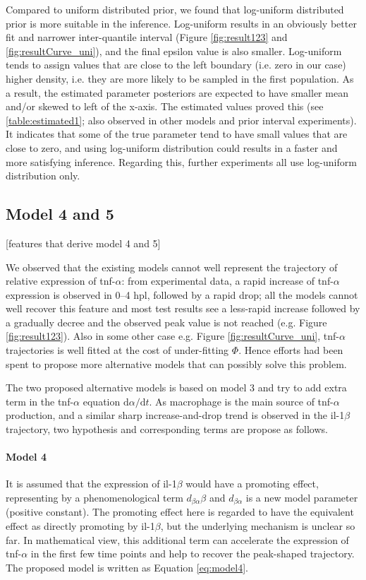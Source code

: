 \documentclass[12pt,a4paper]{report}
\begin{document}
Compared to uniform distributed prior, we found that log-uniform distributed prior is more suitable in the inference. Log-uniform results in an obviously better fit and narrower inter-quantile interval (Figure \ref{fig:result123} and \ref{fig:resultCurve_uni}), and the final epsilon value is also smaller. Log-uniform tends to assign values that are close to the left boundary (i.e. zero in our case) higher density, i.e. they are more likely to be sampled in the first population. As a result, the estimated parameter posteriors are expected to have smaller mean and/or skewed to left of the x-axis. The estimated values proved this (see \ref{table:estimated1}; also observed in other models and prior interval experiments). It indicates that some of the true parameter tend to have small values that are close to zero, and using log-uniform distribution could results in a faster and more satisfying inference. Regarding this, further experiments all use log-uniform distribution only.


\subsection{Model 4 and 5}

[features that derive model 4 and 5]

We observed that the existing models cannot well represent the trajectory of relative expression of tnf-$\alpha$: from experimental data, a rapid increase of tnf-$\alpha$ expression is observed in 0--4 hpl, followed by a rapid drop; all the models cannot well recover this feature and most test results see a less-rapid increase followed by a gradually decree and the observed peak value is not reached (e.g. Figure \ref{fig:result123}). Also in some other case e.g. Figure \ref{fig:resultCurve_uni}, tnf-$\alpha$ trajectories is well fitted at the cost of under-fitting $\Phi$. Hence efforts had been spent to propose more alternative models that can possibly solve this problem.

The two proposed alternative models is based on model 3 and try to add extra term in the tnf-$\alpha$ equation $\mathrm{d} \alpha/\mathrm{d} t$. As macrophage is the main source of tnf-$\alpha$ production, and a similar sharp increase-and-drop trend is observed in the il-1$\beta$ trajectory, two hypothesis and corresponding terms are propose as follows.

\paragraph{Model 4} It is assumed that the expression of il-1$\beta$ would have a promoting effect, representing by a phenomenological term $d_{\beta\alpha}\beta$ and $d_{\beta\alpha}$ is a new model parameter (positive constant). The promoting effect here is regarded to have the equivalent effect as directly promoting by il-1$\beta$, but the underlying mechanism is unclear so far. In mathematical view, this additional term can accelerate the expression of tnf-$\alpha$ in the first few time points and help to recover the peak-shaped trajectory. The proposed model is written as Equation \ref{eq:model4}.
\end{document}
